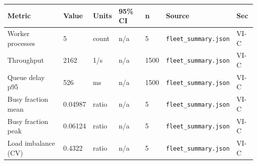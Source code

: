 \begin{tabular}{lllllll}
\hline
Metric & Value & Units & 95\% CI & n & Source & Sec \\
\hline
Worker processes & 5 & count & n/a & 5 & \texttt{fleet_summary.json} & VI-C \\
Throughput & 2162 & 1/s & n/a & 1500 & \texttt{fleet_summary.json} & VI-C \\
Queue delay p95 & 526 & ms & n/a & 1500 & \texttt{fleet_summary.json} & VI-C \\
Busy fraction mean & 0.04987 & ratio & n/a & 5 & \texttt{fleet_summary.json} & VI-C \\
Busy fraction peak & 0.06124 & ratio & n/a & 5 & \texttt{fleet_summary.json} & VI-C \\
Load imbalance (CV) & 0.4322 & ratio & n/a & 5 & \texttt{fleet_summary.json} & VI-C \\
\hline
\end{tabular}
